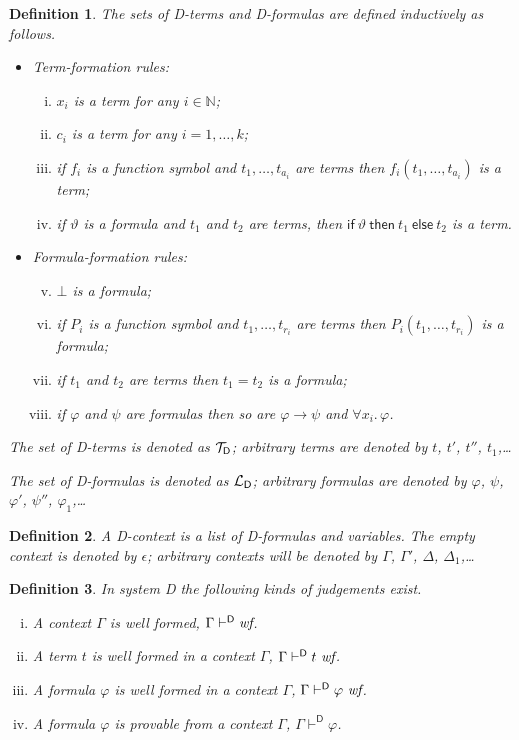 \documentclass{article}
\newtheorem{definition}{Definition}[section]
\newcommand{\D}{\textsf D}
\newcommand{\NN}{\ensuremath{\mathbb N}}
\newcommand{\ifthelse}[3]{\ensuremath{\mathsf{if}\ {#1}\ \mathsf{then}\ {#2}\ \mathsf{else}\ {#3}}}
\newcommand{\ok}{\mbox{\em wf}}
\newcommand{\wf}{\ \mbox{\em wf}}
\newcommand{\lang}[1]{\ensuremath{{\cal L}_{\mathsf{#1}}}}
\newcommand{\terms}[1]{\ensuremath{{\cal T}_{\mathsf{#1}}}}
\newcommand{\myvdash}[1]{\ensuremath{\vdash^{\mathsf{#1}}}}
\def\sep{.\,}
\begin{document}
\begin{definition}%
\label{defn:Dterms}\label{defn:Dformulas}
The sets of {\D}-terms and {\D}-formulas are defined inductively as follows.
\begin{itemize}
\item Term-formation rules:
\begin{enumerate}[(i)]
\item $x_i$ is a term for any $i\in\NN$;
\item $c_i$ is a term for any $i=1,\ldots,k$;
\item if $f_i$ is a function symbol and $t_1,\ldots,t_{a_i}$ are terms
then $f_i(t_1,\ldots,t_{a_i})$ is a term;
\item if $\vartheta$ is a formula and $t_1$ and $t_2$ are terms, then
$\ifthelse\vartheta{t_1}{t_2}$ is a term.
\end{enumerate}
\item Formula-formation rules:
\begin{enumerate}[(i)]\setcounter{enumi}{4}
\item $\bot$ is a formula;
\item if $P_i$ is a function symbol and $t_1,\ldots,t_{r_i}$ are terms
then $P_i(t_1,\ldots,t_{r_i})$ is a formula;
\item if $t_1$ and $t_2$ are terms then $t_1=t_2$ is a formula;
\item if $\varphi$ and $\psi$ are formulas then so are $\varphi\to\psi$
and $\forall x_i\sep\varphi$.
\end{enumerate}
\end{itemize}
The set of {\D}-terms is denoted as {\terms{D}}; arbitrary terms are
denoted by $t$, $t'$, $t''$, $t_1$,\ldots

The set of {\D}-formulas is denoted as {\lang{D}}; arbitrary formulas
are denoted by $\varphi$, $\psi$, $\varphi'$, $\psi''$, $\varphi_1$,\ldots
\end{definition}

\begin{definition}\label{defn:Dcontext}
A {\D}-context is a list of {\D}-formulas and variables.  The empty
context is denoted by $\epsilon$; arbitrary contexts will be denoted
by $\Gamma$, $\Gamma'$, $\Delta$, $\Delta_1$,\ldots
\end{definition}

\begin{definition}\label{defn:Djudgement}
In system {\D} the following kinds of judgements exist.
\begin{enumerate}[(i)]
\item A context $\Gamma$ is well formed, $\Gamma\myvdash{D}\ok$.
\item A term $t$ is well formed in a context $\Gamma$, $\Gamma\myvdash{D}t\wf$.
\item A formula $\varphi$ is well formed in a context $\Gamma$,
$\Gamma\myvdash{D}\varphi\wf$.
\item A formula $\varphi$ is provable from a context $\Gamma$,
$\Gamma\myvdash{D}\varphi$.
\end{enumerate}
\end{definition}
\end{document}
